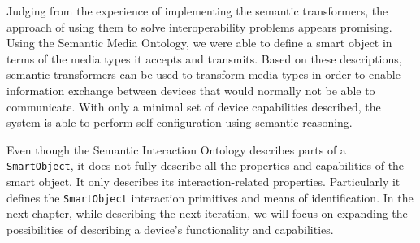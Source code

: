 
Judging from the experience of implementing the semantic transformers, the approach of using them to solve interoperability problems appears promising. Using the Semantic Media Ontology, we were able to define a smart object in terms of the media types it accepts and transmits. Based on these descriptions, semantic transformers can be used to transform media types in order to enable information exchange between devices that would normally not be able to communicate. With only a minimal set of device capabilities described, the system is able to perform self-configuration using semantic reasoning.

Even though the Semantic Interaction Ontology describes parts of a \texttt{SmartObject}, it does not fully describe all the properties and capabilities of the smart object. It only describes its interaction-related properties. Particularly it defines the \texttt{SmartObject} interaction primitives and means of identification. In the next chapter, while describing the next iteration, we will focus on expanding the possibilities of describing a device's functionality and capabilities.


